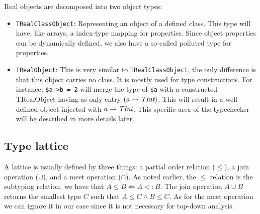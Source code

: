 \documentclass[a4paper]{article}
\begin{document}
\begin{itemize}
    Real objects are decomposed into two object types:
    \begin{itemize}
          \item \verb=TRealClassObject=: Representing an object of a
            defined class. This type will have, like arrays, a index-type
            mapping for properties. Since object properties can be dynamically
            defined, we also have a so-called polluted type for properties.
          \item \verb=TRealObject=: This is very similar to
            \verb=TRealClassObject=, the only difference is that this object
            carries no class. It is mostly used for type constructions. For
            instance, \verb/$a->b = 2/ will merge the type of \verb/$a/ with a
            constructed TRealObject having as only entry $(a \rightarrow
            \emph{TInt})$. This will result in a well defined object injected with $a
            \rightarrow \emph{TInt}$. This specific area of the typechecker will be
            described in more details later.
    \end{itemize}
\end{itemize}

\subsection{Type lattice}
A lattice is usually defined by three things: a partial order relation
($\leq$), a join operation ($\cup$), and a meet operation ($\cap$). As noted
earlier, the $\leq$ relation is the subtyping relation, we have that $A \leq B
\Leftrightarrow A <: B$. The join operation $A \cup B$ returns the smallest
type $C$ such that $A \leq C \wedge B \leq C$. As for the meet operation
we can ignore it in our case since it is not necessary for top-down analysis.
\end{document}
